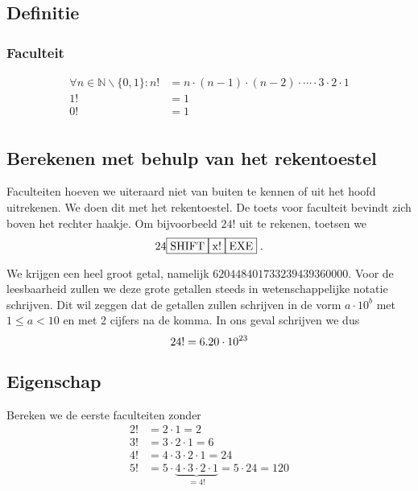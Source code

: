 \documentclass[12pt,a4paper,twoside]{article}
\begin{document}
\subsection{Definitie}

\subsubsection*{Faculteit}
\begin{mdframed}
\begin{align*}
\forall n \in \mathbb{N}\backslash\{0,1\}: n!&=n\cdot(n-1)\cdot(n-2)\cdot \cdots \cdot 3\cdot2\cdot1\\
                           1!&=1\\
                           0!&=1\\
\end{align*}
\end{mdframed}

\subsection{Berekenen met behulp van het rekentoestel}

Faculteiten hoeven we uiteraard niet van buiten te kennen of uit het hoofd uitrekenen. We doen dit met het rekentoestel. De toets voor faculteit bevindt zich boven het rechter haakje. Om bijvoorbeeld $24!$ uit te rekenen, toetsen we
$$24 \zrm{SHIFT} \zrm{x!} \zrm{EXE}\;.$$

We krijgen een heel groot getal, namelijk $620448401733239439360000$. Voor de leesbaarheid zullen we deze grote getallen steeds in wetenschappelijke notatie schrijven. Dit wil zeggen dat de getallen zullen schrijven in de vorm $a \cdot 10^b$ met $1 \leq a < 10$ en met 2 cijfers na de komma. In ons geval schrijven we dus
\[24! = 6.20\cdot 10^{23}\]

\subsection{Eigenschap}

Bereken we de eerste faculteiten zonder 
\begin{align*}
  2! &= 2 \cdot 1 = 2\\
  3! &= 3 \cdot 2 \cdot 1 = 6\\
  4! &= 4 \cdot 3 \cdot 2 \cdot 1 = 24\\
  5! &= 5 \cdot \underbrace{4 \cdot 3 \cdot 2 \cdot 1}_{=4!} = 5 \cdot 24 = 120
\end{align*}
\end{document}
